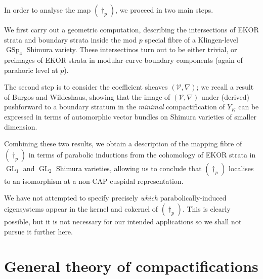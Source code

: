 \documentclass[cjm]{ipart}
\theoremstyle{plain}
\theoremstyle{remark}
\DeclareMathOperator{\GL}{GL}
\DeclareMathOperator{\GSp}{GSp}
\newcommand{\cV}{\mathcal{V}}
\numberwithin{equation}{subsection}
\begin{document}
  In order to analyse the map $(\dag_p)$, we proceed in two main steps.

  We first carry out a geometric computation, describing the intersections of EKOR strata and boundary strata inside the mod $p$ special fibre of a Klingen-level $\GSp_4$ Shimura variety. These intersectinos turn out to be either trivial, or preimages of EKOR strata in modular-curve boundary components (again of parahoric level at $p$).

  The second step is to consider the coefficient sheaves $(\cV, \nabla)$; we recall a result of Burgos and Wildeshaus, showing that the image of $(\cV, \nabla)$ under (derived) pushforward to a boundary stratum in the \emph{minimal} compactification of $Y_K$ can be expressed in terms of automorphic vector bundles on Shimura varieties of smaller dimension.

  Combining these two results, we obtain a description of the mapping fibre of $(\dag_p)$ in terms of parabolic inductions from the cohomology of EKOR strata in $\GL_1$ and $\GL_2$ Shimura varieties, allowing us to conclude that $(\dag_p)$ localises to an isomorphism at a non-CAP cuspidal representation.

  \begin{remark}
   We have not attempted to specify precisely \emph{which} parabolically-induced eigensystems appear in the kernel and cokernel of $(\dag_p)$. This is clearly possible, but it is not necessary for our intended applications so we shall not pursue it further here.
  \end{remark}

%
%
%


\section{General theory of compactifications}
\end{document}

